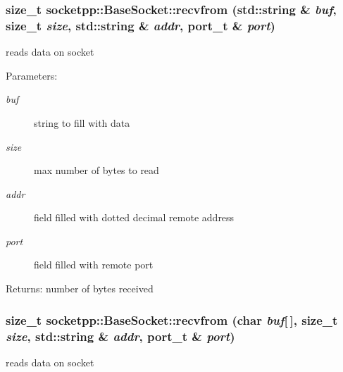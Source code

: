 \begin{CompactItemize}
{\subsubsection[{recvfrom}]{\setlength{\rightskip}{0pt plus 5cm}size\_\-t socketpp::BaseSocket::recvfrom (std::string \& {\em buf}, \/  size\_\-t {\em size}, \/  std::string \& {\em addr}, \/  {\bf port\_\-t} \& {\em port})}}
\label{classsocketpp_1_1BaseSocket_259bb054a2abf0ffadf3c75bce4892b0}


reads data on socket 

\begin{Desc}
\item[Parameters:]
\begin{description}
\item[{\em buf}]string to fill with data \item[{\em size}]max number of bytes to read \item[{\em addr}]field filled with dotted decimal remote address \item[{\em port}]field filled with remote port \end{description}
\end{Desc}
\begin{Desc}
\item[Returns:]number of bytes received \end{Desc}
\hypertarget{classsocketpp_1_1BaseSocket_205fc515468a3df01258f7ebd6fdf38c}{
\subsubsection[{recvfrom}]{\setlength{\rightskip}{0pt plus 5cm}size\_\-t socketpp::BaseSocket::recvfrom (char {\em buf}\mbox{[}$\,$\mbox{]}, \/  size\_\-t {\em size}, \/  std::string \& {\em addr}, \/  {\bf port\_\-t} \& {\em port})}}
\label{classsocketpp_1_1BaseSocket_205fc515468a3df01258f7ebd6fdf38c}


reads data on socket 


\end{CompactItemize}
